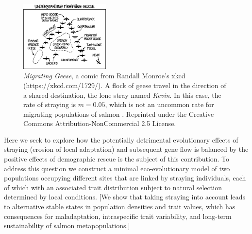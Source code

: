 \documentclass[twocolumn,preprintnumbers,amsmath,amssymb,superscriptaddress]{revtex4}
\begin{document}

\begin{figure}
  \captionsetup{justification=raggedright,
singlelinecheck=false
}
\centering
\includegraphics[width=0.4\textwidth]{figs2/fig_xkcd.png}
\caption{
\emph{Migrating Geese}, a comic from Randall Monroe's xkcd (https://xkcd.com/1729/). 
A flock of geese travel in the direction of a shared destination, the lone stray named \emph{Kevin}.
In this case, the rate of straying is $m=0.05$, which is not an uncommon rate for migrating populations of salmon \cite{Satterthwaite:2015ge}. 
Reprinted under the Creative Commons Attribution-NonCommercial 2.5 License.
} \label{fig:xkcd}
\end{figure}

Here we seek to explore how the potentially detrimental evolutionary effects of straying (erosion of local adaptation) and subsequent gene flow is balanced by the positive effects of demographic rescue is the subject of this contribution.
To address this question we construct a minimal eco-evolutionary model of two populations occupying different sites that are linked by straying individuals, each of which with an associated trait distribution subject to natural selection determined by local conditions.
[We show that taking straying into account leads to alternative stable states in population densities and trait values, which has consequences for maladaptation, intraspecific trait variability, and long-term sustainability of salmon metapopulations.]
\end{document}
